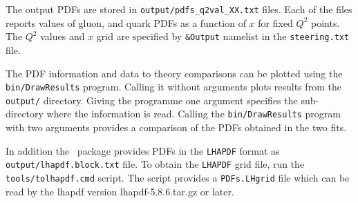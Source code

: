   The output PDFs are stored in  {\tt output/pdfs\_q2val\_XX.txt} files.
  Each of the files reports values of gluon, and quark PDFs as a function of $x$
  for fixed $Q^2$ points. The $Q^2$ values and $x$ grid are specified by 
  {\tt \&Output} namelist in the {\tt steering.txt} file.
  
  The PDF information and data to theory comparisons can be plotted using 
  the {\tt bin/DrawResults} program.  Calling it without arguments plots results from the
  {\tt output/} directory. Giving the programme one argument specifies the sub-directory 
  where the information is read. Calling the {\tt bin/DrawResults} program with two
  arguments provides a comparison of the PDFs obtained in the two fits.
  
  In addition the \fitter\ package provides PDFs in the {\tt LHAPDF} format as {\tt output/lhapdf.block.txt} file. 
  To obtain the
  {\tt LHAPDF} grid file, run the {\tt tools/tolhapdf.cmd} script. The script provides a
  {\tt PDFs.LHgrid} file which can be read by the lhapdf version lhapdf-5.8.6.tar.gz
  or later.


